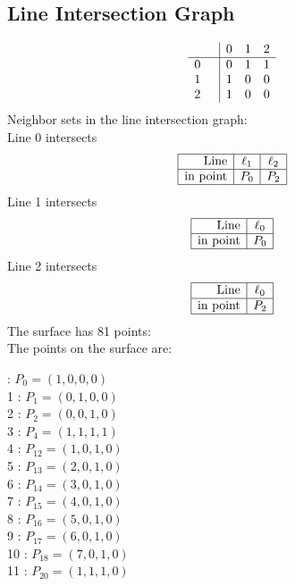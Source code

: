\documentclass{article}
\begin{document}
{\subsection*{Line Intersection Graph}
{\arraycolsep=1pt
$$
\begin{array}{rr|*{3}r}
 &  & 0 & 1 & 2\\
\hline
0 &  & 0 & 1 & 1\\
1 &  & 1 & 0 & 0\\
2 &  & 1 & 0 & 0\\
\end{array}
$$
}%
Neighbor sets in the line intersection graph:\\
Line 0 intersects 
$$
\begin{array}{|r*{2}{|c}|}
\hline
\mbox{Line}  & \ell_{1} & \ell_{2}\\
\hline
\mbox{in point}  & P_{0} & P_{2}\\
\hline
\end{array}
$$
Line 1 intersects 
$$
\begin{array}{|r*{1}{|c}|}
\hline
\mbox{Line}  & \ell_{0}\\
\hline
\mbox{in point}  & P_{0}\\
\hline
\end{array}
$$
Line 2 intersects 
$$
\begin{array}{|r*{1}{|c}|}
\hline
\mbox{Line}  & \ell_{0}\\
\hline
\mbox{in point}  & P_{2}\\
\hline
\end{array}
$$
The surface has 81 points:\\
The points on the surface are:\\
\begin{multicols}{3}
 : $P_{0}=( 1, 0, 0, 0 )$\\
1 : $P_{1}=( 0, 1, 0, 0 )$\\
2 : $P_{2}=( 0, 0, 1, 0 )$\\
3 : $P_{4}=( 1, 1, 1, 1 )$\\
4 : $P_{12}=( 1, 0, 1, 0 )$\\
5 : $P_{13}=( 2, 0, 1, 0 )$\\
6 : $P_{14}=( 3, 0, 1, 0 )$\\
7 : $P_{15}=( 4, 0, 1, 0 )$\\
8 : $P_{16}=( 5, 0, 1, 0 )$\\
9 : $P_{17}=( 6, 0, 1, 0 )$\\
10 : $P_{18}=( 7, 0, 1, 0 )$\\
11 : $P_{20}=( 1, 1, 1, 0 )$\\

\end{multicols}}
\end{document}
